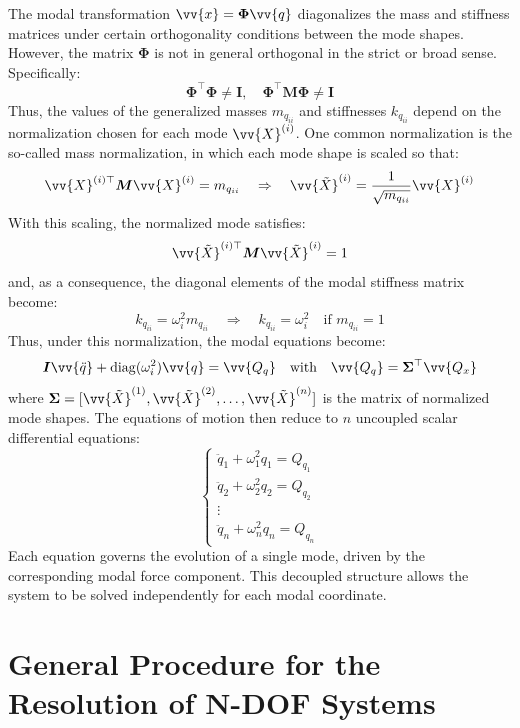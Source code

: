 The modal transformation \( \vv{x} = \boldsymbol{\Phi} \vv{q} \) diagonalizes the mass and stiffness matrices under certain orthogonality conditions between the mode shapes. However, the matrix \( \boldsymbol{\Phi} \) is not in general orthogonal in the strict or broad sense. Specifically:
\[
\boldsymbol{\Phi}^\top \boldsymbol{\Phi} \neq \boldsymbol{I}, \quad \boldsymbol{\Phi}^\top \boldsymbol{M} \boldsymbol{\Phi} \neq \boldsymbol{I}
\]
Thus, the values of the generalized masses \( m_{q_{ii}} \) and stiffnesses \( k_{q_{ii}} \) depend on the normalization chosen for each mode \( \vv{X}^{(i)} \). One common normalization is the so-called mass normalization, in which each mode shape is scaled so that:
\[
\vv{X}^{(i)\top} \boldsymbol{M} \vv{X}^{(i)} = m_{q_{ii}} \quad \Rightarrow \quad \vv{\tilde{X}}^{(i)} = \frac{1}{\sqrt{m_{q_{ii}}}} \vv{X}^{(i)}
\]
With this scaling, the normalized mode satisfies:
\[
\vv{\tilde{X}}^{(i)\top} \boldsymbol{M} \vv{\tilde{X}}^{(i)} = 1
\]
and, as a consequence, the diagonal elements of the modal stiffness matrix become:
\[
k_{q_{ii}} = \omega_i^2 m_{q_{ii}} \quad \Rightarrow \quad
k_{q_{ii}} = \omega_i^2 \quad \text{if } m_{q_{ii}} = 1
\]
Thus, under this normalization, the modal equations become:
\[
\boldsymbol{I}  \vv{\ddot{q}} + \operatorname{diag}(\omega_i^2) \vv{q} = \vv{Q_q}
\quad \text{with} \quad
\vv{Q_q} = \boldsymbol{\Sigma}^\top \vv{Q_x}
\]
where \( \boldsymbol{\Sigma} = [\vv{\tilde{X}}^{(1)}, \vv{\tilde{X}}^{(2)}, \dots, \vv{\tilde{X}}^{(n)}] \) is the matrix of normalized mode shapes. The equations of motion then reduce to \( n \) uncoupled scalar differential equations:
\[
\begin{cases}
\ddot{q}_1 + \omega_1^2 q_1 = Q_{q_1} \\
\ddot{q}_2 + \omega_2^2 q_2 = Q_{q_2} \\
\vdots \\
\ddot{q}_n + \omega_n^2 q_n = Q_{q_n}
\end{cases}
\]
Each equation governs the evolution of a single mode, driven by the corresponding modal force component. This decoupled structure allows the system to be solved independently for each modal coordinate.

\section{General Procedure for the Resolution of N-DOF Systems}

